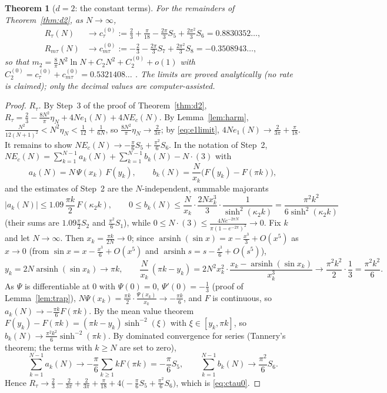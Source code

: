 \documentclass[11pt,a4paper]{article}
\DeclareMathOperator{\arsinh}{arsinh}
\theoremstyle{plain}
\newtheorem{theorem}{Theorem}[section]
\theoremstyle{definition}
\numberwithin{equation}{section}
\begin{document}
\begin{theorem}[$d=2$: the constant terms]\label{thm:d2limits}
For the remainders of Theorem~\ref{thm:d2}, as $N\to\infty$,
\begin{align}
R_\tau(N)&\to c^{(0)}_{\tau}:=\frac23+\frac\pi{18}-\frac{2\pi}{3}S_5+\frac{2\pi^2}{3}S_6=0.8830352\ldots,\label{eq:ctau0}\\
R_{m\tau}(N)&\to c^{(0)}_{m\tau}:=-\frac23-\frac{2\pi}{3}S_7+\frac{2\pi^2}{3}S_8=-0.3508943\ldots,\label{eq:cmtau0}
\end{align}
so that $m_2=\frac8\pi N^2\ln N+C_2N^2+C_2^{(0)}+o(1)$ with $C_2^{(0)}=c^{(0)}_\tau+c^{(0)}_{m\tau}=0.5321408\ldots$ . The limits are proved analytically (no rate is claimed); only the decimal values are computer-assisted.
\end{theorem}
\begin{proof}
\emph{$R_\tau$.} By Step~3 of the proof of Theorem~\ref{thm:d2}, $R_\tau=\frac23-\frac{8N^2}\pi\eta_N+4Ne_1(N)+4NE_c(N)$. By Lemma~\ref{lem:harm}, $\frac{N^2}{12(N+1)^2}<N^2\eta_N<\frac1{12}+\frac1{6N}$, so $\frac{8N^2}{\pi}\eta_N\to\frac{2}{3\pi}$; by \eqref{eq:e1limit}, $4Ne_1(N)\to\frac2{3\pi}+\frac\pi{18}$. It remains to show $NE_c(N)\to-\frac\pi6S_5+\frac{\pi^2}6S_6$. In the notation of Step~2, $NE_c(N)=\sum_{k=1}^{N-1}a_k(N)+\sum_{k=1}^{N-1}b_k(N)-N\cdot(3)$ with
\[
a_k(N)=N\,\Psi(x_k)\,F(y_k),\qquad b_k(N)=\frac{N}{x_k}\big(F(y_k)-F(\pi k)\big),
\]
and the estimates of Step~2 are the $N$-independent, summable majorants
\[
|a_k(N)|\le1.09\,\frac{\pi k}{2}\,F(\kappa_2k),\qquad0\le b_k(N)\le\frac{N}{x_k}\cdot\frac{2Nx_k^3}{3}\cdot\frac{1}{\sinh^2(\kappa_2k)}=\frac{\pi^2k^2}{6\sinh^2(\kappa_2k)}
\]
(their sums are $1.09\frac\pi2S_2$ and $\frac{\pi^2}{6}S_1$), while $0\le N\cdot(3)\le\frac{4Ne^{-2\pi N}}{\pi(1-e^{-2\pi})^2}\to0$. Fix $k$ and let $N\to\infty$. Then $x_k=\frac{\pi k}{2N}\to0$; since $\arsinh(\sin x)=x-\frac{x^3}{3}+O(x^5)$ as $x\to0$ (from $\sin x=x-\frac{x^3}6+O(x^5)$ and $\arsinh s=s-\frac{s^3}{6}+O(s^5)$),
\[
y_k=2N\arsinh(\sin x_k)\to\pi k,\qquad \frac{N}{x_k}\,(\pi k-y_k)=2N^2x_k^2\cdot\frac{x_k-\arsinh(\sin x_k)}{x_k^3}\to\frac{\pi^2k^2}{2}\cdot\frac13=\frac{\pi^2k^2}{6}.
\]
As $\Psi$ is differentiable at $0$ with $\Psi(0)=0$, $\Psi'(0)=-\frac13$ (proof of Lemma~\ref{lem:trap}), $N\Psi(x_k)=\frac{\pi k}{2}\cdot\frac{\Psi(x_k)}{x_k}\to-\frac{\pi k}{6}$, and $F$ is continuous, so $a_k(N)\to-\frac{\pi k}6F(\pi k)$. By the mean value theorem $F(y_k)-F(\pi k)=(\pi k-y_k)\sinh^{-2}(\xi)$ with $\xi\in[y_k,\pi k]$, so $b_k(N)\to\frac{\pi^2k^2}{6}\sinh^{-2}(\pi k)$. By dominated convergence for series (Tannery's theorem; the terms with $k\ge N$ are set to zero),
\[
\sum_{k=1}^{N-1}a_k(N)\to-\frac\pi6\sum_{k\ge1}kF(\pi k)=-\frac\pi6S_5,\qquad\sum_{k=1}^{N-1}b_k(N)\to\frac{\pi^2}6S_6 .
\]
Hence $R_\tau\to\frac23-\frac{2}{3\pi}+\frac{2}{3\pi}+\frac{\pi}{18}+4\big(-\frac\pi6S_5+\frac{\pi^2}{6}S_6\big)$, which is \eqref{eq:ctau0}.


\end{proof}
\end{document}
